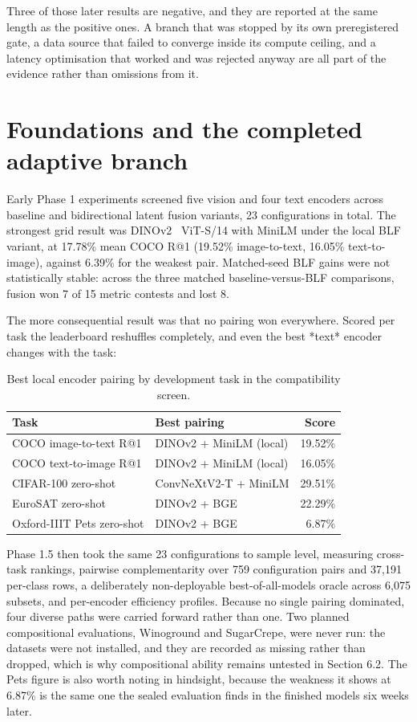 Three of those later results are negative, and they are reported at the same length as the positive ones. A branch that was stopped by its own preregistered gate, a data source that failed to converge inside its compute ceiling, and a latency optimisation that worked and was rejected anyway are all part of the evidence rather than omissions from it.

\section{Foundations and the completed adaptive branch}
Early Phase 1 experiments screened five vision and four text encoders across baseline and bidirectional latent fusion variants, 23 configurations in total. The strongest grid result was DINOv2~\cite{oquab2023dinov2} ViT-S/14 with MiniLM under the local BLF variant, at 17.78\% mean COCO R@1 (19.52\% image-to-text, 16.05\% text-to-image), against 6.39\% for the weakest pair. Matched-seed BLF gains were not statistically stable: across the three matched baseline-versus-BLF comparisons, fusion won 7 of 15 metric contests and lost 8.

The more consequential result was that no pairing won everywhere. Scored per task the leaderboard reshuffles completely, and even the best *text* encoder changes with the task:

\begin{table}[htbp]
\centering
\caption{Best local encoder pairing by development task in the compatibility screen.}
\label{tab:compatibility}
\begin{tabular}{L{4.0cm}L{5.0cm}r}
\toprule
Task & Best pairing & Score \\
\midrule
COCO image-to-text R@1 & DINOv2 + MiniLM (local) & 19.52\% \\
COCO text-to-image R@1 & DINOv2 + MiniLM (local) & 16.05\% \\
CIFAR-100 zero-shot & ConvNeXtV2-T + MiniLM & 29.51\% \\
EuroSAT zero-shot & DINOv2 + BGE & 22.29\% \\
Oxford-IIIT Pets zero-shot & DINOv2 + BGE & 6.87\% \\
\bottomrule
\end{tabular}
\end{table}
Phase 1.5 then took the same 23 configurations to sample level, measuring cross-task rankings, pairwise complementarity over 759 configuration pairs and 37,191 per-class rows, a deliberately non-deployable best-of-all-models oracle across 6,075 subsets, and per-encoder efficiency profiles. Because no single pairing dominated, four diverse paths were carried forward rather than one. Two planned compositional evaluations, Winoground and SugarCrepe, were never run: the datasets were not installed, and they are recorded as missing rather than dropped, which is why compositional ability remains untested in Section 6.2. The Pets figure is also worth noting in hindsight, because the weakness it shows at 6.87\% is the same one the sealed evaluation finds in the finished models six weeks later.

